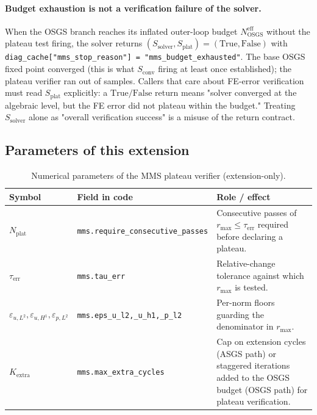 \documentclass{article}
\newcommand{\code}[1]{\texttt{\small #1}}
\newcommand{\extline}[1]{{\color{extcolor}#1}}
\begin{document}
\extline{\paragraph{Budget exhaustion is not a verification failure
of the solver.} When the OSGS branch reaches its inflated outer-loop
budget $N_{\mathrm{OSGS}}^{\mathrm{eff}}$ without the plateau test
firing, the solver returns
$(S_{\mathrm{solver}}, S_{\mathrm{plat}}) = (\mathrm{True}, \mathrm{False})$
with \code{diag\_cache["mms\_stop\_reason"] = "mms\_budget\_exhausted"}.
The base OSGS fixed point converged (this is what $S_{\mathrm{conv}}$
firing at least once established); the plateau verifier ran out of
samples. Callers that care about FE-error verification must read
$S_{\mathrm{plat}}$ explicitly: a $\mathrm{True}/\mathrm{False}$
return means "solver converged at the algebraic level, but the FE
error did not plateau within the budget." Treating $S_{\mathrm{solver}}$
alone as "overall verification success" is a misuse of the return
contract.}

\subsection{Parameters of this extension}

\begin{table}[h]
\centering
\caption{\extline{Numerical parameters of the MMS plateau verifier (extension-only).}}
\label{tab:mms-params}
\footnotesize
\textcolor{extcolor}{%
\begin{tabularx}{\textwidth}{@{} l l X @{}}
\toprule
\textbf{Symbol} & \textbf{Field in code} & \textbf{Role / effect} \\
\midrule
$N_{\mathrm{plat}}$ & \code{mms.require\_consecutive\_passes} & Consecutive passes of $r_{\max} \le \tau_{\mathrm{err}}$ required before declaring a plateau. \\
$\tau_{\mathrm{err}}$ & \code{mms.tau\_err} & Relative-change tolerance against which $r_{\max}$ is tested. \\
$\varepsilon_{u,L^2}, \varepsilon_{u,H^1}, \varepsilon_{p,L^2}$ & \code{mms.eps\_u\_l2,\_u\_h1,\_p\_l2} & Per-norm floors guarding the denominator in $r_{\max}$. \\
$K_{\mathrm{extra}}$ & \code{mms.max\_extra\_cycles} & Cap on extension cycles (ASGS path) or staggered iterations added to the OSGS budget (OSGS path) for plateau verification. \\
\bottomrule
\end{tabularx}}
\end{table}
\end{document}
